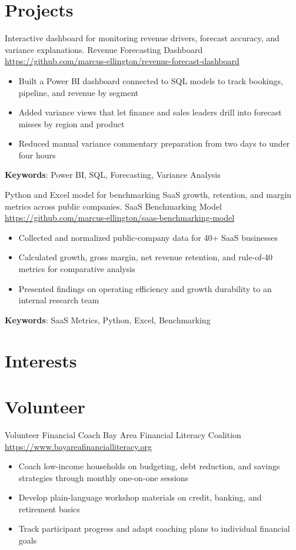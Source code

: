 \documentclass[a4paper, serif, 10pt]{moderncv}
\begin{document}
\section{Projects}

        {Interactive dashboard for monitoring revenue drivers, forecast accuracy, and variance explanations.}
        {Revenue Forecasting Dashboard}
        {\url{https://github.com/marcus-ellington/revenue-forecast-dashboard}}
        {}
        {\begin{itemize}
\item Built a Power BI dashboard connected to SQL models to track bookings, pipeline, and revenue by segment
\item Added variance views that let finance and sales leaders drill into forecast misses by region and product
\item Reduced manual variance commentary preparation from two days to under four hours
\end{itemize}
\textbf{Keywords}: Power BI, SQL, Forecasting, Variance Analysis}

        {Python and Excel model for benchmarking SaaS growth, retention, and margin metrics across public companies.}
        {SaaS Benchmarking Model}
        {\url{https://github.com/marcus-ellington/saas-benchmarking-model}}
        {}
        {\begin{itemize}
\item Collected and normalized public-company data for 40+ SaaS businesses
\item Calculated growth, gross margin, net revenue retention, and rule-of-40 metrics for comparative analysis
\item Presented findings on operating efficiency and growth durability to an internal research team
\end{itemize}
\textbf{Keywords}: SaaS Metrics, Python, Excel, Benchmarking}
\section{Interests}

\section{Volunteer}

        {Volunteer Financial Coach}
        {Bay Area Financial Literacy Coalition}
        {\url{https://www.bayareafinancialliteracy.org}}
        {}
        {\begin{itemize}
\item Coach low-income households on budgeting, debt reduction, and savings strategies through monthly one-on-one sessions
\item Develop plain-language workshop materials on credit, banking, and retirement basics
\item Track participant progress and adapt coaching plans to individual financial goals
\end{itemize}}
    
\end{document}

